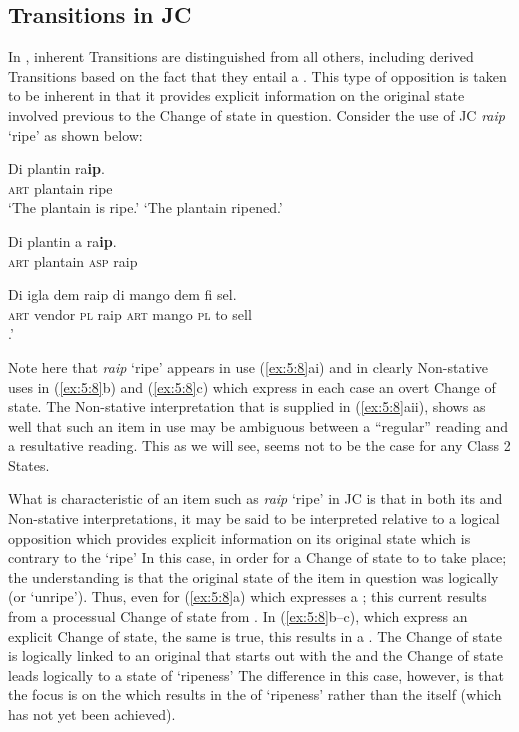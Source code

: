 \subsection{Transitions in JC}\label{sec:5.2.1}

In , inherent Transitions are distinguished from all others, including derived Transitions based on the fact that they entail a . This type of opposition is taken to be inherent in that it provides explicit information on the original state involved previous to the Change of state in question. Consider the use of JC \textit{raip} `ripe' as shown below: 

\ea%
\label{ex:5:8}
\ea
\gll Di plantin ra\textbf{ip}.\\
\textsc{art} plantain ripe \\
 \ea `The plantain is ripe.’ 
 \ex `The plantain ripened.'
\z

\ex 
 \gll Di plantin a ra\textbf{ip}.\\
\textsc{art} plantain \textsc{asp} raip \\

\ex 
 \gll Di igla dem raip di mango dem fi sel.\\
\textsc{art} vendor {\textsc{pl}} raip \textsc{art} mango {\textsc{pl}} to sell \\
 .'
\z
\z

Note here that \textit{raip} `ripe' appears in  use (\ref{ex:5:8}ai) and in clearly Non-stative uses in (\ref{ex:5:8}b) and (\ref{ex:5:8}c) which express in each case an overt Change of state. The Non-stative interpretation that is supplied in (\ref{ex:5:8}aii), shows as well that such an item in  use may be ambiguous between a ``regular''  reading and a resultative reading. This as we will see, seems not to be the case for any Class 2 States. 

What is characteristic of an item such as \textit{raip} `ripe' in JC is that in both its  and Non-stative interpretations, it may be said to be interpreted relative to a logical opposition which provides explicit information on its original state which is contrary to the  `ripe' In this case, in order for a Change of state to \RIPE to take place; the understanding is that the original state of the item in question was logically \GREEN (or `unripe'). Thus, even for (\ref{ex:5:8}a) which expresses a ; this current  results from a processual Change of state from \GREEN. In (\ref{ex:5:8}b--c), which express an explicit Change of state, the same is true, this results in a . The Change of state is logically linked to an original  that starts out with the \GREEN and the Change of state leads logically to a state of `ripeness' The difference in this case, however, is that the focus is on the  which results in the  of `ripeness' rather than the  itself (which has not yet been achieved). 

